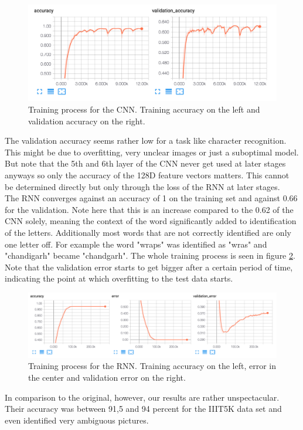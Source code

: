 \documentclass{utue} %
\begin{document}
\begin{figure}[h!]
	\centering
	\includegraphics[width=\columnwidth]{graphics/cnn_accuracy.png}
	\caption{\label{fig:cnn_accuracy}Training process for the CNN. Training accuracy on the left and validation accuracy on the right.}
\end{figure}

The validation accuracy seems rather low for a task like character recognition. This might be due to overfitting, very unclear images or just a suboptimal model. But note that the 5th and 6th layer of the CNN never get used at later stages anyways so only the accuracy of the 128D feature vectors matters. This cannot be determined directly but only through the loss of the RNN at later stages. \\
The RNN converges against an accuracy of 1 on the training set and against 0.66 for the validation. Note here that this is an increase compared to the 0.62 of the CNN solely, meaning the context of the word significantly added to identification of the letters. Additionally most words that are not correctly identified are only one letter off. For example the word "wraps" was identified as "wras" and "chandigarh" became "chandgarh".%
The whole training process is seen in figure \ref{fig:rnn_accuracy}. Note that the validation error starts to get bigger after a certain period of time, indicating the point at which overfitting to the test data starts. \\

\begin{figure}[h!]
	\centering
	\includegraphics[width=\columnwidth]{graphics/rnn_accuracy.png}
	\caption{\label{fig:rnn_accuracy} Training process for the RNN. Training accuracy on the left, error in the center and validation error on the right.}
\end{figure} 
In comparison to the original, however, our results are rather unspectacular. Their accuracy was between 91,5 and 94 percent for the IIIT5K data set and even identified very ambiguous pictures.
\end{document}

